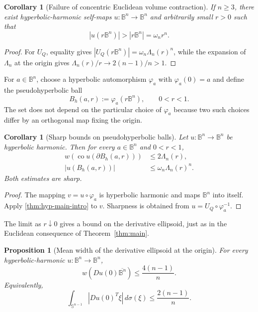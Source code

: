 \documentclass[11pt,reqno]{amsart}
\newtheorem{corollary}[theorem]{Corollary}
\newtheorem{proposition}[theorem]{Proposition}
\theoremstyle{remark}
\newcommand{\B}{\mathbb B}
\newcommand{\Sph}{\mathbb S}
\newcommand{\co}{\operatorname{co}}
\begin{document}
\begin{corollary}[Failure of concentric Euclidean volume contraction]\label{hyp:cor:hyp-no-contraction}
If $n\ge3$, there exist hyperbolic-harmonic self-maps $u:\mathbb B^n\to\mathbb B^n$ and arbitrarily small $r>0$ such that
\[
 |u(r\mathbb B^n)|>|r\mathbb B^n|=\omega_nr^n.
\]
\end{corollary}
\begin{proof}
For $U_Q$, equality gives $|U_Q(r\mathbb B^n)|=\omega_n\Lambda_n(r)^n$, while the expansion of $\Lambda_n$ at the origin gives $\Lambda_n(r)/r\to2(n-1)/n>1$.
\end{proof}

For $a\in\B^n$, choose a hyperbolic automorphism $\varphi_a$ with $\varphi_a(0)=a$ and define the pseudohyperbolic ball
\begin{equation}\label{hyp:eq:pseudohyp-ball}
 B_h(a,r):=\varphi_a(r\B^n),\qquad 0<r<1.
\end{equation}
The set does not depend on the particular choice of $\varphi_a$ because two such choices differ by an orthogonal map fixing the origin.

\begin{corollary}[Sharp bounds on pseudohyperbolic balls]\label{hyp:cor:pseudohyp}
Let $u:\B^n\to\B^n$ be hyperbolic harmonic. Then for every $a\in\B^n$ and $0<r<1$,
\begin{align}
 w\!\left(\co u(\partial B_h(a,r))\right)&\le2\Lambda_n(r),\label{hyp:eq:pseudo-width}\\
 |u(B_h(a,r))|&\le\omega_n\Lambda_n(r)^n.\label{hyp:eq:pseudo-volume}
\end{align}
Both estimates are sharp.
\end{corollary}

\begin{proof}
The mapping $v=u\circ\varphi_a$ is hyperbolic harmonic and maps $\B^n$ into itself. Apply \cref{thm:hyp-main-intro} to $v$. Sharpness is obtained from $u=U_Q\circ\varphi_a^{-1}$.
\end{proof}

The limit as $r\downarrow0$ gives a bound on the derivative ellipsoid,
just as in the Euclidean consequence of Theorem~\ref{thm:main}.

\begin{proposition}[Mean width of the derivative ellipsoid at the origin]\label{hyp:prop:origin-derivative}
For every hyperbolic-harmonic $u:\B^n\to\B^n$,
\begin{equation}\label{hyp:eq:origin-width}
 w\!\left(Du(0)\overline{\B^n}\right)
 \le \frac{4(n-1)}n.
\end{equation}
Equivalently,
\begin{equation}\label{hyp:eq:origin-average}
 \int_{\Sph^{n-1}}|Du(0)^T\xi|\,d\sigma(\xi)
 \le\frac{2(n-1)}n.
\end{equation}
\end{proposition}
\end{document}
